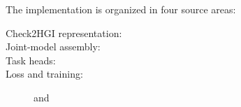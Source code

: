 The implementation is organized in four source areas:
{\small
\begin{description}
    \item[Check2HGI representation:] 
    \item[Joint-model assembly:] 
    \item[Task heads:] 
    \item[Loss and training:]  and 
\end{description}
}
